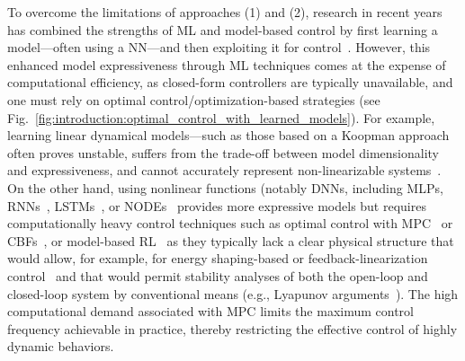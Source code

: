 To overcome the limitations of approaches (1) and (2), research in recent years has combined the strengths of \gls{ML} and model-based control by first learning a model—often using a \gls{NN}—and then exploiting it for control~\citep{gillespie2018learning, thuruthel2018model, bruder2020data, bruder2024koopman, alora2023data, alora2023robust, chen2024data}. However, this enhanced model expressiveness through \gls{ML} techniques comes at the expense of computational efficiency, as closed-form controllers are typically unavailable, and one must rely on optimal control/optimization-based strategies (see Fig.~\ref{fig:introduction:optimal_control_with_learned_models}).
For example, learning linear dynamical models—such as those based on a Koopman approach~\citep{bruder2020data, bruder2024koopman} often proves unstable, suffers from the trade-off between model dimensionality and expressiveness, and cannot accurately represent non-linearizable systems~\citep{cenedese2022data}. On the other hand, using nonlinear functions (notably \glspl{DNN}, including \glspl{MLP}, \glspl{RNN}~\citep{thuruthel2018model, sun2022physics}, \glspl{LSTM}~\citep{xie2023dynamic}, or \glspl{NODE}~\citep{kasaei2023data} provides more expressive models but requires computationally heavy control techniques such as optimal control with \gls{MPC}~\citep{gillespie2018learning, aswani2013provably, kabzan2019learning, hewing2020learning, alora2023data, alora2023robust} or \glspl{CBF}~\citep{taylor2020learning}, or model-based \gls{RL}~\citep{thuruthel2018model} as they typically lack a clear physical structure that would allow, for example, for energy shaping-based or feedback-linearization control~\citep{khalil2002nonlinear} and that would permit stability analyses of both the open-loop and closed-loop system by conventional means (e.g., Lyapunov arguments~\citep{khalil2002nonlinear}). 
The high computational demand associated with \gls{MPC} limits the maximum control frequency achievable in practice, thereby restricting the effective control of highly dynamic behaviors.

